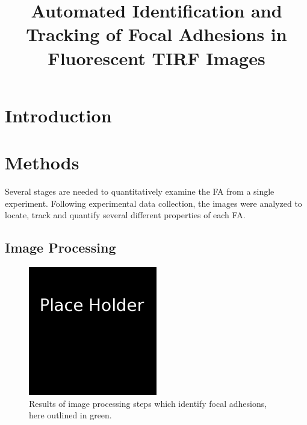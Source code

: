 \documentclass[letterpaper,twocolumn]{article}
\title{Automated Identification and Tracking of Focal Adhesions in Fluorescent TIRF Images}
\begin{document}
\maketitle

\begin{abstract}

\end{abstract}

\section*{Introduction}

\section*{Methods}

Several stages are needed to quantitatively examine the FA from a single experiment. Following experimental data collection, the images were analyzed to locate, track and quantify several different properties of each FA.

\subsection*{Image Processing}

\begin{figure}[htbp]
\begin{center}
\includegraphics[width=0.5\textwidth]{figures/place_holder}
\caption{Results of image processing steps which identify focal adhesions, here outlined in green.}
\label{cell_sample}
\end{center}
\end{figure}
\end{document}
